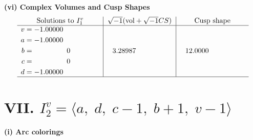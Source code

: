 \documentclass[1p]{elsarticle_modified}
\theoremstyle{definition}
\newcommand{\I}{\sqrt{-1}}
\begin{document}
\newpage\flushleft \textbf{(vi) Complex Volumes and Cusp Shapes}
$$\begin{array}{c|c|c}  
\text{Solutions to }I^v_{1}& \I (\text{vol} + \sqrt{-1}CS) & \text{Cusp shape}\\
 \hline 
\begin{aligned}
v &= -1.00000\phantom{ +0.000000I} \\
a &= -1.00000\phantom{ +0.000000I} \\
b &= \phantom{-0.000000 } 0 \\
c &= \phantom{-0.000000 } 0 \\
d &= -1.00000\phantom{ +0.000000I}\end{aligned}
 & \phantom{-}3.28987\phantom{ +0.000000I} & \phantom{-}12.0000\phantom{ +0.000000I}\\
 \hline 
 \end{array}$$\newpage\newpage\renewcommand{\arraystretch}{1}
\centering \section*{VII. $I^v_{2}= \langle a,\;d,\;c-1,\;b+1,\;v-1 \rangle$}
\flushleft \textbf{(i) Arc colorings}\\
\end{document}
